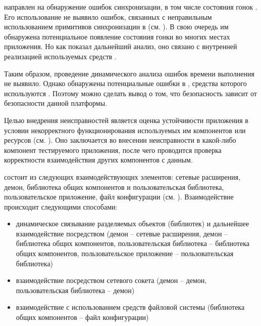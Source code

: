 %
 направлен на обнаружение ошибок синхронизации, в том числе состояния гонок . 
%
Его использование не выявило ошибок, связанных с неправильным использованием примитивов синхронизации в \PeerHood (см. ). 
%
В свою очередь им обнаружена потенциальное появление состояния гонки во многих местах приложения. 
%
Но как показал дальнейший анализ, оно связано с внутренней реализацией используемых средств \Qt. 

%
Таким образом, проведение динамического анализа \PeerHood ошибок времени выполнения не выявило. 
%
Однако обнаружены потенциальные ошибки в \Qt, средства которого используются \PeerHood. 
%
Поэтому можно сделать вывод о том, что безопасность \PeerHood зависит от безопасности данной платформы.  



%
Целью внедрения неисправностей является оценка устойчивости приложения в условии некорректного функционирования используемых им компонентов или ресурсов (см. ). 
%
Оно заключается во внесении неисправности в какой-либо компонент тестируемого приложения, после чего проводится проверка корректности взаимодействия других компонентов с данным. 

%
\PeerHood состоит из следующих взаимодействующих элементов: сетевые расширения, демон, библиотека общих компонентов и пользовательская библиотека, пользовательское приложение, файл конфигурации (см. ). 
%
Взаимодействие происходит следующими способами:
\begin{itemize}
	\setlength{\itemsep}{0pt}%

	\item динамическое связывание разделяемых объектов (библиотек) и дальнейшее взаимодействие посредством  (демон -- сетевые расширения, демон -- библиотека общих компонентов, пользовательская библиотека -- библиотека общих компонентов, пользовательское приложение -- пользовательская библиотека)
	\item взаимодействие посредством сетевого сокета (демон -- демон, пользовательская библиотека -- демон)
	\item взаимодействие с использованием средств файловой системы (библиотека общих компонентов -- файл конфигурации)
\end{itemize}

